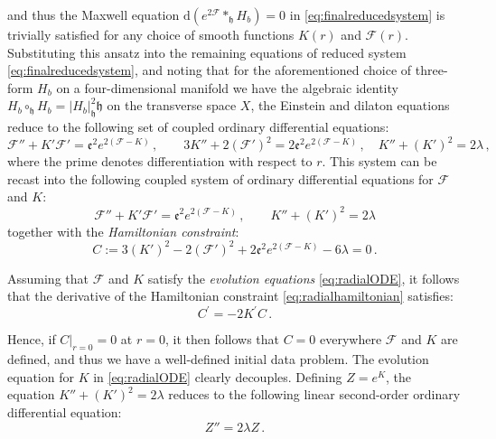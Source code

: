 \documentclass[10pt,a4paper,twoside,reqno]{amsart}
\theoremstyle{plain}
\theoremstyle{definition}
\theoremstyle{remark}
\def\dd{\mathrm{d}}
\def\cF{\mathcal{F}}
\def\dd{\mathrm{d}}
\begin{document}
\noindent
and thus the Maxwell equation $\dd(e^{2\cF} \ast_{\mathfrak{h}} H_b) = 0$ in \eqref{eq:finalreducedsystem} is trivially satisfied for any choice of smooth functions $K(r)$ and $\cF(r)$. Substituting this ansatz into the remaining equations of reduced system \eqref{eq:finalreducedsystem}, and noting that for the aforementioned choice of three-form $H_b$ on a four-dimensional manifold we have the algebraic identity $H_b \circ_{\mathfrak{h}} H_b = |H_b|^2_{\mathfrak{h}} \mathfrak{h}$ on the transverse space $X$, the Einstein and dilaton equations reduce to the following set of coupled ordinary differential equations:
\begin{equation*}
\cF'' + K' \cF' = \mathfrak{e}^2 e^{2(\cF - K)} \, , \qquad 3 K'' + 2 (\cF')^2  =    2\mathfrak{e}^2 e^{2(\cF - K)} \, , \quad   K'' + (K')^2 = 2\lambda\, ,
\end{equation*}
where the prime denotes differentiation with respect to $r$. This system can be recast into the following coupled system of ordinary differential equations for $\cF$ and $K$:
\begin{equation} 
\label{eq:radialODE}
\cF'' + K' \cF' = \mathfrak{e}^2 e^{2(\cF - K)} \, ,   \qquad   K'' + (K')^2 = 2\lambda
\end{equation}
together with the \emph{Hamiltonian constraint}:
\begin{equation}
\label{eq:radialhamiltonian}
C := 3(K')^2 - 2(\mathcal{F}')^2 + 2\mathfrak{e}^2 e^{2(\mathcal{F}-K)} - 6\lambda = 0\, .
\end{equation}

\noindent
Assuming that $\cF$ and $K$ satisfy the \emph{evolution equations} \eqref{eq:radialODE}, it follows that the derivative of the Hamiltonian constraint \eqref{eq:radialhamiltonian} satisfies:
\begin{equation*}
C^{\prime} = -2 K^{\prime} C\, .
\end{equation*}

\noindent
Hence, if $C \vert_{r=0} = 0$ at $r=0$, it then follows that $C= 0$ everywhere $\cF$ and $K$ are defined, and thus we have a well-defined initial data problem. The evolution equation for $K$ in \eqref{eq:radialODE} clearly decouples. Defining $Z = e^{K}$, the equation $K'' + (K')^2 = 2\lambda$ reduces to the following linear second-order ordinary differential equation:
\begin{equation}
\label{eq:linearwarp}
Z''  = 2\lambda Z\, .
\end{equation}
\end{document}
